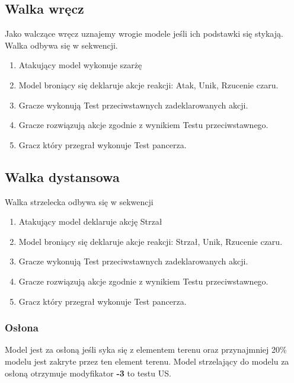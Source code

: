 \subsection{Walka wręcz}
Jako walczące wręcz uznajemy wrogie modele jeśli ich podstawki się stykają. Walka odbywa się w sekwencji.
\begin{enumerate}
    \item Atakujący model wykonuje szarżę
    \item Model broniący się deklaruje akcje reakcji: Atak, Unik, Rzucenie czaru. 
    \item Gracze wykonują Test przeciwstawnych zadeklarowanych akcji.
    \item Gracze rozwiązują akcje zgodnie z wynikiem Testu przeciwstawnego.
    \item Gracz który przegrał wykonuje Test pancerza.
\end{enumerate}
\subsection{Walka dystansowa}
Walka strzelecka odbywa się w sekwencji
\begin{enumerate}
    \item Atakujący model deklaruje akcję Strzał
    \item Model broniący się deklaruje akcje reakcji: Strzał, Unik, Rzucenie czaru. 
    \item Gracze wykonują Test przeciwstawnych zadeklarowanych akcji.
    \item Gracze rozwiązują akcje zgodnie z wynikiem Testu przeciwstawnego. 
    \item Gracz który przegrał wykonuje Test pancerza.
\end{enumerate}
\subsubsection{Osłona}
Model jest za osłoną jeśli syka się z elementem terenu oraz przynajmniej 20\% modelu jest zakryte przez ten element terenu. Model strzelający do modelu za osłoną otrzymuje modyfikator \textbf{-3} to testu US. 